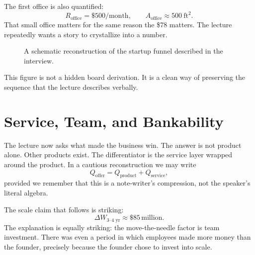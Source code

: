The first office is also quantified:
\begin{equation}
R_{\text{office}} = \$500/\text{month}, \qquad A_{\text{office}} \approx 500\ \text{ft}^2.
\end{equation}
That small office matters for the same reason the \$78 matters. The lecture repeatedly wants a story to crystallize into a number.

\begin{figure}
\centering
{}
\caption{A schematic reconstruction of the startup funnel described in the interview.}
\end{figure}

This figure is not a hidden board derivation. It is a clean way of preserving the sequence that the lecture describes verbally.

\section{Service, Team, and Bankability}

The lecture now asks what made the business win. The answer is not product alone. Other products exist. The differentiator is the service layer wrapped around the product. In a cautious reconstruction we may write
\begin{equation}
Q_{\text{offer}} = Q_{\text{product}} + Q_{\text{service}},
\end{equation}
provided we remember that this is a note-writer’s compression, not the speaker’s literal algebra.

The scale claim that follows is striking:
\begin{equation}
\Delta W_{3\text{--}4\text{ yr}} \approx \$85\,\text{million}.
\end{equation}
The explanation is equally striking: the move-the-needle factor is team investment. There was even a period in which employees made more money than the founder, precisely because the founder chose to invest into scale.

